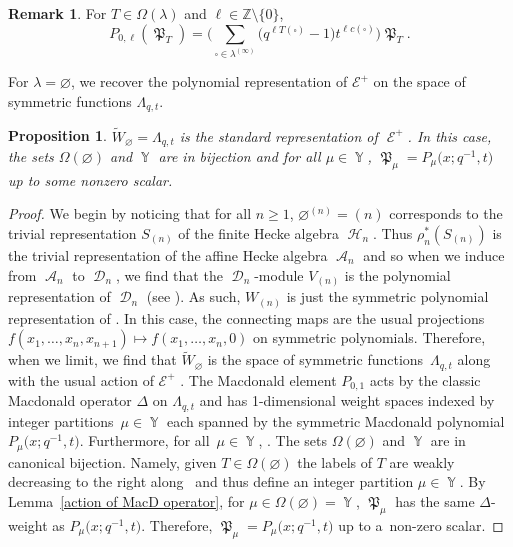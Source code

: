 \documentclass[10pt,a4paper]{amsart}
\numberwithin{equation}{section}
\newtheorem{Proposition}[Theorem]{Proposition}
\theoremstyle{definition}
\newtheorem{Remark}[Theorem]{Remark}
\DeclareMathOperator{\Par}{\mathbb{Y}}
\DeclareMathOperator{\sH}{\mathscr{H}}
\DeclareMathOperator{\sA}{\mathscr{A}}
\DeclareMathOperator{\sD}{\mathscr{D}}
\DeclareMathOperator{\MacD}{\mathfrak{P}}
\DeclareMathOperator{\sE}{\mathcal{E}}
\begin{document}
\begin{Remark}
 For $T \in \Omega(\lambda)$ and $\ell \in \mathbb{Z} \setminus \{0\}$,
 \[
 P_{0,\ell}(\MacD_T) = \biggl( \sum_{\square \in \lambda^{(\infty)}} \bigl(q^{\ell T(\square)}-1 \bigr) t^{\ell c(\square)} \biggr) \MacD_T.
 \]

\end{Remark}

For $\lambda = \varnothing$, we recover the polynomial representation of $\mathcal{E}^{+}$ on the space of symmetric functions $\Lambda_{q,t}$.

\begin{Proposition}\label{Proposition recover usual Macd}
 $\widetilde{W}_{\varnothing} = \Lambda_{q,t}$ is the standard representation of $\sE^{+}$. In this case, the sets $\Omega(\varnothing)$ and $\Par$ are in bijection and for all $\mu \in \Par$, $\MacD_{\mu} = P_{\mu}\bigl(x;q^{-1},t\bigr)$ up to some nonzero scalar.
\end{Proposition}
\begin{proof}
 We begin by noticing that for all $n\geq 1$, $\varnothing^{(n)} = (n)$ corresponds to the trivial representation $S_{(n)}$ of the finite Hecke algebra $\sH_n$. Thus $\rho_n^{*}(S_{(n)})$ is the trivial representation of the affine Hecke algebra $\sA_n$ and so when we induce from $\sA_n$ to $\sD_n$, we find that the $\sD_n$-module $V_{(n)}$ is the polynomial representation of $\sD_n$ (see \cite[Theorem 3.2.1]{CherednikBook}). As such, $W_{(n)}$ is just the symmetric polynomial representation of \smash{$\sD_n^{\mathrm{sph}}$}. In this case, the connecting maps  are the usual projections $f(x_1,\dots,x_n,x_{n+1}) \mapsto f(x_1,\dots,x_n,0)$ on symmetric polynomials.
 Therefore, when we limit, we find that $\widetilde{W}_{\varnothing}$ is the space of symmetric functions~$\Lambda_{q,t}$ along with the usual action of $\mathcal{E}^{+}$ \cite[Corollary 1.5]{SV}. The Macdonald element $P_{0,1}$ acts by the classic Macdonald operator $\Delta$ on $\Lambda_{q,t}$ and has 1-dimensional weight spaces indexed by integer partitions~${\mu \in \Par}$ each spanned by the symmetric Macdonald polynomial $P_{\mu}\bigl(x;q^{-1},t\bigr)$. Furthermore, for all~${\mu \in \Par}$,
 . The sets $\Omega(\varnothing)$ and $\Par$ are in canonical bijection. Namely, given $T \in \Omega(\varnothing)$ the labels of $T$ are weakly decreasing to the right along~\smash{$\varnothing^{(\infty)}$} and thus define an integer partition $\mu \in \Par$. By Lemma~\ref{action of MacD operator}, for $\mu \in \Omega(\varnothing)= \Par$, $\MacD_{\mu}$ has the same $\Delta$-weight as $P_{\mu}\bigl(x;q^{-1},t\bigr)$. Therefore, $\MacD_{\mu} = P_{\mu}\bigl(x;q^{-1},t\bigr)$ up to a~non-zero scalar.
\end{proof}
\end{document}

